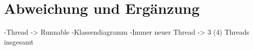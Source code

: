 \chapter{Abweichung und Ergänzung}\label{ch:abweichung-und-ergaenzung}
-Thread -> Runnable
-Klassendiagramm
-Immer neuer Thread -> 3 (4) Threads insgesamt
